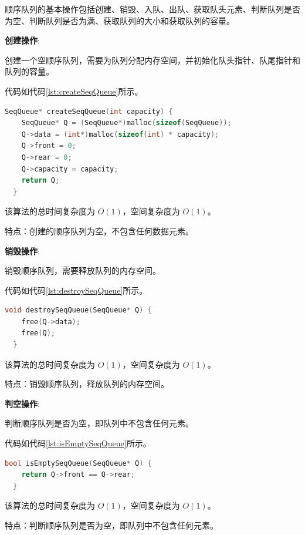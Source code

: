 \documentclass[lang=cn,newtx,10pt,scheme=chinese]{elegantbook}
\begin{document}
顺序队列的基本操作包括创建、销毁、入队、出队、获取队头元素、判断队列是否为空、判断队列是否为满、获取队列的大小和获取队列的容量。

\textbf{创建操作}:

创建一个空顺序队列，需要为队列分配内存空间，并初始化队头指针、队尾指针和队列的容量。

代码如代码\ref{lst:createSeqQueue}所示。

\begin{lstlisting}[language=C++, caption={创建一个空顺序队列示例代码}, label={lst:createSeqQueue}]
  SeqQueue* createSeqQueue(int capacity) {
    SeqQueue* Q = (SeqQueue*)malloc(sizeof(SeqQueue));
    Q->data = (int*)malloc(sizeof(int) * capacity);
    Q->front = 0;
    Q->rear = 0;
    Q->capacity = capacity;
    return Q;
  }

\end{lstlisting}

该算法的总时间复杂度为 $O(1)$，空间复杂度为 $O(1)$。

特点：创建的顺序队列为空，不包含任何数据元素。

\textbf{销毁操作}:

销毁顺序队列，需要释放队列的内存空间。

代码如代码\ref{lst:destroySeqQueue}所示。

\begin{lstlisting}[language=C++, caption={销毁顺序队列示例代码}, label={lst:destroySeqQueue}]
  void destroySeqQueue(SeqQueue* Q) {
    free(Q->data);
    free(Q);
  }

\end{lstlisting}

该算法的总时间复杂度为 $O(1)$，空间复杂度为 $O(1)$。

特点：销毁顺序队列，释放队列的内存空间。

\textbf{判空操作}:

判断顺序队列是否为空，即队列中不包含任何元素。

代码如代码\ref{lst:isEmptySeqQueue}所示。

\begin{lstlisting}[language=C++, caption={判断顺序队列是否为空示例代码}, label={lst:isEmptySeqQueue}]
  bool isEmptySeqQueue(SeqQueue* Q) {
    return Q->front == Q->rear;
  }

\end{lstlisting}

该算法的总时间复杂度为 $O(1)$，空间复杂度为 $O(1)$。

特点：判断顺序队列是否为空，即队列中不包含任何元素。
\end{document}

